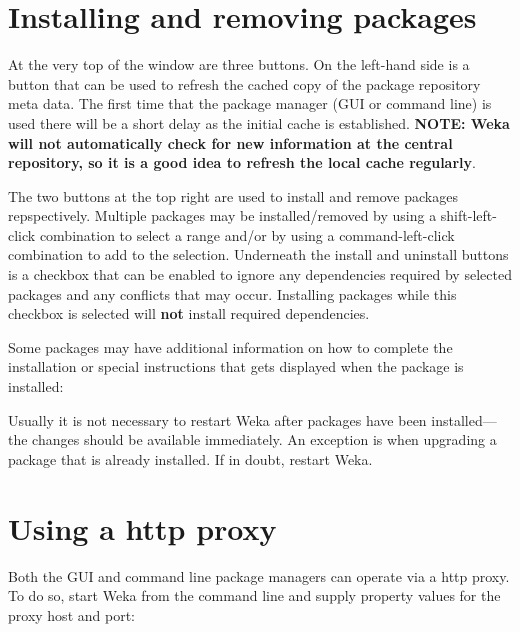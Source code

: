 \begin{center}
\end{center}

\section{Installing and removing packages}

At the very top of the window are three buttons. On the left-hand side
is a button that can be used to refresh the cached copy of the package
repository meta data. The first time that the package manager (GUI or
command line) is used there will be a short delay as the initial cache
is established. \textbf{NOTE: Weka will not automatically check for
new information at the central repository, so it is a good idea to
refresh the local cache regularly}.

The two buttons at the top right are used to install and remove
packages repspectively. Multiple packages may be installed/removed by
using a shift-left-click combination to select a range and/or by using
a command-left-click combination to add to the selection. Underneath
the install and uninstall buttons is a checkbox that can be enabled to
ignore any dependencies required by selected packages and any
conflicts that may occur. Installing packages while this checkbox is
selected will \textbf{not} install required dependencies.

Some packages may have additional information on how to complete the
installation or special instructions that gets displayed when the
package is installed:

\begin{center}
\end{center}

Usually it is not necessary to restart Weka after packages have been
installed---the changes should be available immediately. An exception
is when upgrading a package that is already installed. If in doubt, 
restart Weka.

\section{Using a http proxy}

Both the GUI and command line package managers can operate via a http proxy. To do so,
start Weka from the command line and supply property values for the proxy host and port:

